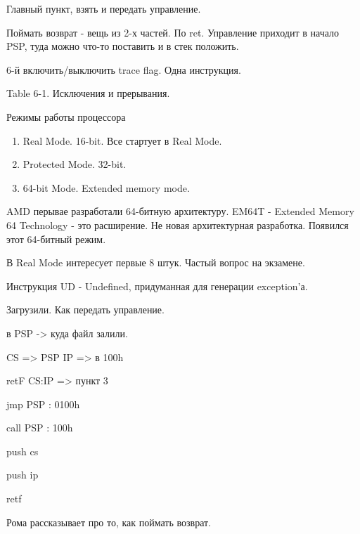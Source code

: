 Главный пункт, взять и передать управление. 




Поймать возврат - вещь из 2-х частей. По ret. Управление приходит в начало PSP, туда можно что-то поставить и в стек положить.

6-й включить/выключить trace flag. Одна инструкция.

Table 6-1. Исключения и прерывания.

Режимы работы процессора
\begin{enumerate}
\item Real Mode. 16-bit. Все стартует в Real Mode. 
\item Protected Mode. 32-bit.
\item 64-bit Mode. Extended memory mode.
\end{enumerate}

AMD перывае разработали 64-битную архитектуру. EM64T - Extended Memory 64 Technology - это расширение. Не новая архитектурная разработка. Появился этот 64-битный режим. 
\begin{rem}В Real Mode интересует первые 8 штук. Частый вопрос на экзамене.\end{rem}
Инструкция UD - Undefined, придуманная для генерации exception'а.

Загрузили. Как передать управление.

в PSP -> куда файл залили. 

CS => PSP
IP => в 100h

retF CS:IP => пункт 3

jmp PSP : 0100h

call PSP : 100h

push cs

push ip

retf


Рома рассказывает про то, как поймать возврат. 